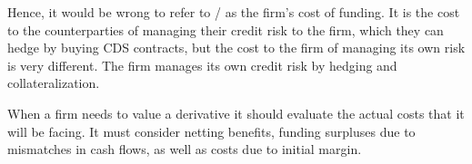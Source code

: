 \documentclass[main.tex]{subfiles}
\begin{document}
    Hence, it would be wrong to refer to \DVA/ as the firm's cost of funding.
    It is the cost to the counterparties of managing their credit risk to the firm,
    which they can hedge by buying CDS contracts,
    but the cost to the firm of managing its own risk is very different. 
    The firm manages its own credit risk by hedging and collateralization.

    When a firm needs to value a derivative it should evaluate the actual costs that it will be facing.
    It must consider netting benefits, funding surpluses due to mismatches in cash flows,
    as well as costs due to initial margin.
\end{document}

